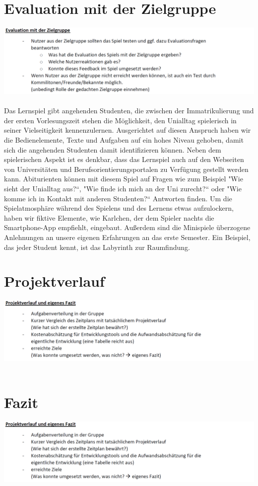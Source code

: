 \documentclass[a4paper, 11pt]{article} %
\begin{document}
\section{Evaluation mit der Zielgruppe}
\includegraphics[scale=0.5]{images/evaluation.png}\\\\
Das Lernspiel gibt angehenden Studenten, die zwischen der Immatrikulierung und der ersten Vorlesungszeit stehen die Möglichkeit, den Unialltag spielerisch in seiner Vielseitigkeit kennenzulernen. Ausgerichtet auf diesen Anspruch haben wir die Bedienelemente, Texte und Aufgaben auf ein hohes Niveau gehoben, damit sich die angehenden Studenten damit identifizieren können. Neben dem spielerischen Aspekt ist es denkbar, dass das Lernspiel auch auf den Webseiten von Universitäten und Berufsorientierungsportalen zu Verfügung gestellt werden kann. Abiturienten können mit diesem Spiel auf Fragen wie zum Beispiel "Wie sieht der Unialltag aus?“, "Wie finde ich mich an der Uni zurecht?“ oder "Wie komme ich in Kontakt mit anderen Studenten?“ Antworten finden. Um die Spielatmosphäre während des Spielens und des Lernens etwas aufzulockern, haben wir fiktive Elemente, wie Karlchen, der dem Spieler nachts die Smartphone-App empfiehlt, eingebaut. Außerdem sind die Minispiele überzogene Anlehnungen an unsere eigenen Erfahrungen an das erste Semester. Ein Beispiel, das jeder Student kennt, ist das Labyrinth zur Raumfindung. 
\section{Projektverlauf}
\includegraphics[scale=0.5]{images/projektverlauf.png}\\\\
\section{Fazit}
\includegraphics[scale=0.5]{images/projektverlauf.png}\\\\
\end{document}
